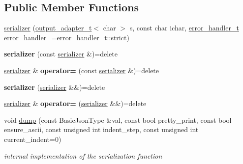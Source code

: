 \subsection*{Public Member Functions}
\begin{DoxyCompactItemize}
\item 
\hyperlink{classnlohmann_1_1detail_1_1serializer_ac010525281d97867ee842da37294fe83}{serializer} (\hyperlink{namespacenlohmann_1_1detail_a9b680ddfb58f27eb53a67229447fc556}{output\+\_\+adapter\+\_\+t}$<$ char $>$ s, const char ichar, \hyperlink{namespacenlohmann_1_1detail_a5a76b60b26dc8c47256a996d18d967df}{error\+\_\+handler\+\_\+t} error\+\_\+handler\+\_\+=\hyperlink{namespacenlohmann_1_1detail_a5a76b60b26dc8c47256a996d18d967dfa2133fd717402a7966ee88d06f9e0b792}{error\+\_\+handler\+\_\+t\+::strict})
\item 
\mbox{\label{classnlohmann_1_1detail_1_1serializer_ae3771351ec4cb892bec707edeb56dc31}} 
{\bfseries serializer} (const \hyperlink{classnlohmann_1_1detail_1_1serializer}{serializer} \&)=delete
\item 
\mbox{\label{classnlohmann_1_1detail_1_1serializer_a5f14c33012477b9f9876dc54d97009a0}} 
\hyperlink{classnlohmann_1_1detail_1_1serializer}{serializer} \& {\bfseries operator=} (const \hyperlink{classnlohmann_1_1detail_1_1serializer}{serializer} \&)=delete
\item 
\mbox{\label{classnlohmann_1_1detail_1_1serializer_a28081304e70cca6b3042c101ee5c498c}} 
{\bfseries serializer} (\hyperlink{classnlohmann_1_1detail_1_1serializer}{serializer} \&\&)=delete
\item 
\mbox{\label{classnlohmann_1_1detail_1_1serializer_acaafe3436ee5fb74777eb4132a88c513}} 
\hyperlink{classnlohmann_1_1detail_1_1serializer}{serializer} \& {\bfseries operator=} (\hyperlink{classnlohmann_1_1detail_1_1serializer}{serializer} \&\&)=delete
\item 
void \hyperlink{classnlohmann_1_1detail_1_1serializer_a95460ebd1a535a543e5a0ec52e00f48b}{dump} (const Basic\+Json\+Type \&val, const bool pretty\+\_\+print, const bool ensure\+\_\+ascii, const unsigned int indent\+\_\+step, const unsigned int current\+\_\+indent=0)
\begin{DoxyCompactList}\small\item\em internal implementation of the serialization function \end{DoxyCompactList}\item 

\end{DoxyCompactItemize}
